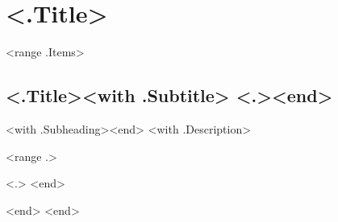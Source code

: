 \section{<.Title>}
<range .Items>
\subsection{\textbf{<.Title>}<with .Subtitle> <.><end>}
<with .Subheading><end>
<with .Description>
\begin{tightitemize}
<range .>
\item <.>
<end>
\end{tightitemize}
<end>
<end>